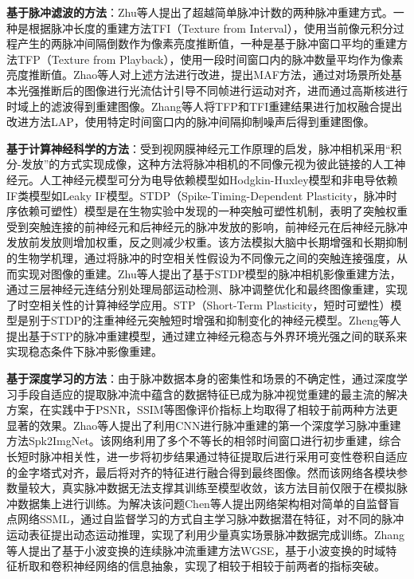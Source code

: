 \textbf{基于脉冲滤波的方法}：Zhu\cite{TFP_TFI}等人提出了超越简单脉冲计数的两种脉冲重建方式。一种是根据脉冲长度的重建方法TFI（Texture from Interval），使用当前像元积分过程产生的两脉冲间隔倒数作为像素亮度推断值，一种是基于脉冲窗口平均的重建方法TFP（Texture from Playback），使用一段时间窗口内的脉冲数量平均作为像素亮度推断值。Zhao等人\citep{MAF_1,MAF_2}对上述方法进行改进，提出MAF方法，通过对场景所处基本光强推断后的图像进行光流估计引导不同帧进行运动对齐，进而通过高斯核进行时域上的滤波得到重建图像。Zhang等人\cite{Spike_Similarity}将TFP和TFI重建结果进行加权融合提出改进方法LAP，使用特定时间窗口内的脉冲间隔抑制噪声后得到重建图像。

\textbf{基于计算神经科学的方法}：受到视网膜神经元工作原理的启发，脉冲相机采用“积分-发放”的方式实现成像，这种方法将脉冲相机的不同像元视为彼此链接的人工神经元。人工神经元模型可分为电导依赖模型如Hodgkin-Huxley模型\cite{HH}和非电导依赖IF类模型如Leaky IF模型\cite{Leaky_IF}。STDP（Spike-Timing-Dependent Plasticity，脉冲时序依赖可塑性）模型\cite{STDP}是在生物实验中发现的一种突触可塑性机制，表明了突触权重 受到突触连接的前神经元和后神经元的脉冲发放的影响，前神经元在后神经元脉冲发放前发放则增加权重，反之则减少权重。该方法模拟大脑中长期增强和长期抑制的生物学机理，通过将脉冲的时空相关性假设为不同像元之间的突触连接强度，从而实现对图像的重建。Zhu等人\cite{STDP_Spike}提出了基于STDP模型的脉冲相机影像重建方法，通过三层神经元连结分别处理局部运动检测、脉冲调整优化和最终图像重建，实现了时空相关性的计算神经学应用。STP（Short-Term Plasticity，短时可塑性）模型\citep{STP_1,STP_2}是别于STDP的注重神经元突触短时增强和抑制变化的神经元模型。Zheng等人\cite{Zheng_STP}提出基于STP的脉冲重建模型，通过建立神经元稳态与外界环境光强之间的联系来实现稳态条件下脉冲影像重建。

\textbf{基于深度学习的方法}：由于脉冲数据本身的密集性和场景的不确定性，通过深度学习手段自适应的提取脉冲流中蕴含的数据特征已成为脉冲视觉重建的最主流的解决方案，在实践中于PSNR，SSIM等\cite{PSNR_SSIM}图像评价指标上均取得了相较于前两种方法更显著的效果。Zhao等人\cite{Spike2ImageNet}提出了利用CNN进行脉冲重建的第一个深度学习脉冲重建方法Spk2ImgNet。该网络利用了多个不等长的相邻时间窗口进行初步重建，综合长短时脉冲相关性，进一步将初步结果通过特征提取后进行采用可变性卷积自适应的金字塔式对齐，最后将对齐的特征进行融合得到最终图像。然而该网络各模块参数量较大，真实脉冲数据无法支撑其训练至模型收敛，该方法目前仅限于在模拟脉冲数据集上进行训练。为解决该问题Chen等人\cite{SSML}提出网络架构相对简单的自监督盲点网络SSML，通过自监督学习的方式自主学习脉冲数据潜在特征，对不同的脉冲运动表征提出动态运动推理，实现了利用少量真实场景脉冲数据完成训练。Zhang等人\cite{WGSE}提出了基于小波变换的连续脉冲流重建方法WGSE，基于小波变换的时域特征析取和卷积神经网络的信息抽象，实现了相较于相较于前两者的指标突破。


